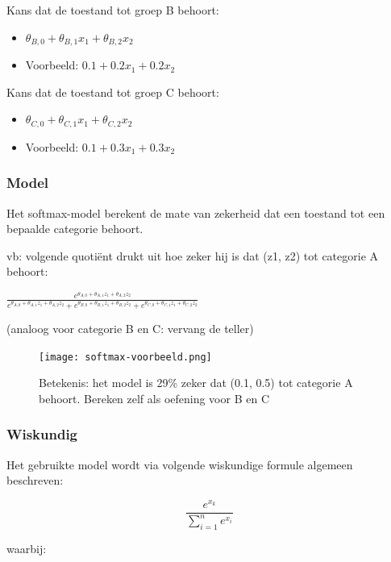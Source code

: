 \documentclass{article}
\begin{document}
Kans dat de toestand tot groep B behoort:

\begin{itemize}
    \item $\theta_{B,0} + \theta_{B,1}x_1 + \theta_{B,2}x_2$
    \item Voorbeeld: $0.1 + 0.2x_1 + 0.2x_2$
\end{itemize}

Kans dat de toestand tot groep C behoort:

\begin{itemize}
    \item $\theta_{C,0} + \theta_{C,1}x_1 + \theta_{C,2}x_2$
    \item Voorbeeld: $0.1 + 0.3x_1 + 0.3x_2$
\end{itemize}

\subsubsection{Model}

Het softmax-model berekent de mate van zekerheid dat een toestand tot een bepaalde categorie behoort.

vb: volgende quotiënt drukt uit hoe zeker hij is dat (z1, z2) tot categorie A behoort:

$\frac{e^{\theta_{A,0} + \theta_{A,1}z_1 + \theta_{A,2}z_2}}{e^{\theta_{A,0} + \theta_{A,1}z_1 + \theta_{A,2}z_2} + e^{\theta_{B,0} + \theta_{B,1}z_1 + \theta_{B,2}z_2} + e^{\theta_{C,0} + \theta_{C,1}z_1 + \theta_{C,2}z_2} }$

(analoog voor categorie B en C: vervang de teller)

\begin{figure}[H]
    \centering
    \texttt{[image: softmax-voorbeeld.png]}
    \caption{Betekenis: het model is 29\% zeker dat (0.1, 0.5) tot categorie A behoort. Bereken zelf als oefening voor B en C}
\end{figure}

\subsubsection{Wiskundig}

Het gebruikte model wordt via volgende wiskundige formule algemeen beschreven:

\begin{equation}
\frac{e^{x_k}}{\sum_{i=1}^n e^{x_i}}
\end{equation}

waarbij:
\end{document}

